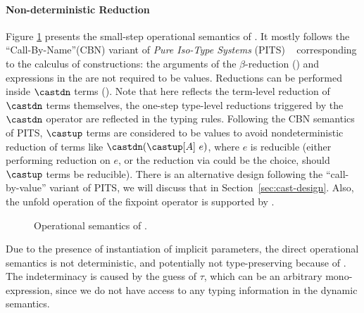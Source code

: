 \paragraph{Non-deterministic Reduction}
Figure \ref{fig:semantics} presents the small-step operational semantics of \name.
It mostly follows the ``Call-By-Name''(CBN) variant of \emph{Pure Iso-Type Systems} (PITS)
~\citep{yang2019pure} corresponding to the calculus of constructions:
the arguments of the $\beta$-reduction () and expressions in
the  are not required to be values.
Reductions can be performed inside $\castdn$ terms ().
Note that here  reflects the term-level reduction of $\castdn$ terms themselves,
the one-step type-level reductions triggered by the $\castdn$ operator are
reflected in the typing rules.
Following the CBN semantics of PITS, $\castup$ terms are considered to be values
to avoid nondeterministic reduction of terms like $\castdn (\castup [A] ~e)$,
where $e$ is reducible (either performing reduction on $e$, or the reduction via
 could be the choice, should $\castup$ terms be reducible).
There is an alternative design following the ``call-by-value'' variant of PITS, we
will discuss that in Section~\ref{sec:cast-design}.
Also, the unfold operation of the fixpoint operator is supported by .

\begin{figure}[t]
    \centering


    \caption{Operational semantics of \name.}
    \label{fig:semantics}
\end{figure}

Due to the presence of instantiation of implicit parameters, the direct operational
semantics is not deterministic, and potentially not type-preserving because of
. The indeterminacy is caused by the guess of $\tau$,
which can be an arbitrary mono-expression, since we do not have access to any typing
information in the dynamic semantics.

